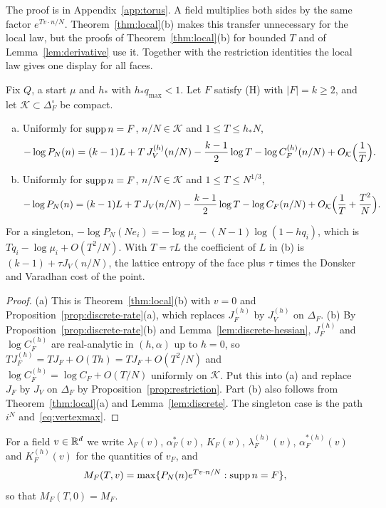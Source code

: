 The proof is in Appendix~\ref{app:torus}. A field
multiplies both sides by the same factor $e^{Tv\cdot n/N}$. Theorem~\ref{thm:local}(b)
makes this transfer unnecessary for the local law, but the proofs of
Theorem~\ref{thm:local}(b) for bounded $T$ and of Lemma~\ref{lem:derivative} use it.
Together with the restriction identities the local law gives one display for all
faces.

\begin{theorem}\label{thm:stratified}
Fix $Q$, a start $\mu$ and $h_*$ with $h_*q_{\max}<1$. Let $F$ satisfy \textup{(H)} with
$|F|=k\ge2$, and let $\mathcal K\subset\Delta_F^\circ$ be compact.
\begin{enumerate}[(a)]
\item Uniformly for $\operatorname{supp} n=F$, $n/N\in\mathcal K$ and $1\le T\le h_*N$,
\[
 -\log P_N(n)=(k-1)L+T\,J^{(h)}_V(n/N)-\frac{k-1}2\log T-\log C^{(h)}_F(n/N)
 +O_{\mathcal K}\Bigl(\frac1T\Bigr).
\]
\item Uniformly for $\operatorname{supp} n=F$, $n/N\in\mathcal K$ and $1\le T\le N^{1/3}$,
\[
 -\log P_N(n)=(k-1)L+T\,J_V(n/N)-\frac{k-1}2\log T-\log C_F(n/N)+O_{\mathcal K}\Bigl(\frac1T+\frac{T^2}N\Bigr).
\]
\end{enumerate}
For a singleton, $-\log P_N(Ne_i)=-\log\mu_i-(N-1)\log(1-hq_i)$, which is
$Tq_i-\log\mu_i+O(T^2/N)$. With $T=\tau L$ the coefficient of $L$ in (b) is
$(k-1)+\tau J_V(n/N)$, the lattice entropy of the face plus $\tau$ times the
Donsker and Varadhan cost of the point.
\end{theorem}

\begin{proof}
(a) This is Theorem~\ref{thm:local}(b) with $v=0$ and
Proposition~\ref{prop:discrete-rate}(a), which replaces $J^{(h)}_F$ by $J^{(h)}_V$
on $\Delta_F$. (b) By Proposition~\ref{prop:discrete-rate}(b) and
Lemma~\ref{lem:discrete-hessian}, $J^{(h)}_F$ and $\log C^{(h)}_F$ are
real-analytic in $(h,\alpha)$ up to $h=0$, so
$TJ^{(h)}_F=TJ_F+O(Th)=TJ_F+O(T^2/N)$ and $\log C^{(h)}_F=\log C_F+O(T/N)$
uniformly on $\mathcal K$. Put this into (a) and replace $J_F$ by $J_V$ on
$\Delta_F$ by Proposition~\ref{prop:restriction}. Part (b) also follows from
Theorem~\ref{thm:local}(a) and Lemma~\ref{lem:discrete}. The singleton case is the
path $i^N$ and~\eqref{eq:vertexmax}.
\end{proof}

For a field $v\in\mathbb{R}^d$ we write $\lambda_F(v)$, $\alpha^*_F(v)$, $K_F(v)$,
$\lambda^{(h)}_F(v)$, $\alpha^{*(h)}_F(v)$ and $K^{(h)}_F(v)$ for the quantities of
$v_F$, and
\[
M_F(T,v)=\max\{P_N(n)e^{Tv\cdot n/N}:\operatorname{supp} n=F\},
\]
so that $M_F(T,0)=M_F$.

